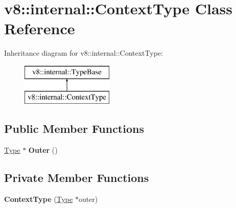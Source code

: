 \hypertarget{classv8_1_1internal_1_1_context_type}{}\section{v8\+:\+:internal\+:\+:Context\+Type Class Reference}
\label{classv8_1_1internal_1_1_context_type}
Inheritance diagram for v8\+:\+:internal\+:\+:Context\+Type\+:\begin{figure}[H]
\begin{center}
\leavevmode
\includegraphics[height=2.000000cm]{classv8_1_1internal_1_1_context_type}
\end{center}
\end{figure}
\subsection*{Public Member Functions}
\begin{DoxyCompactItemize}
\item 
\hyperlink{classv8_1_1internal_1_1_type}{Type} $\ast$ {\bfseries Outer} ()\hypertarget{classv8_1_1internal_1_1_context_type_a7f550e8b4e93a7c58a0606bbef0a13ec}{}\label{classv8_1_1internal_1_1_context_type_a7f550e8b4e93a7c58a0606bbef0a13ec}

\end{DoxyCompactItemize}
\subsection*{Private Member Functions}
\begin{DoxyCompactItemize}
\item 
{\bfseries Context\+Type} (\hyperlink{classv8_1_1internal_1_1_type}{Type} $\ast$outer)\hypertarget{classv8_1_1internal_1_1_context_type_a8c77fe183c2e59738f080b37977febb3}{}\label{classv8_1_1internal_1_1_context_type_a8c77fe183c2e59738f080b37977febb3}

\end{DoxyCompactItemize}
